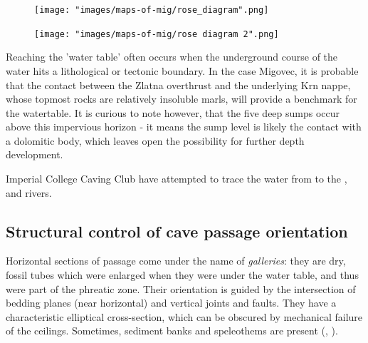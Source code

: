 \begin{pagefigure}
\checkoddpage \ifoddpage \forcerectofloat \else \forceversofloat \fi


\begin{subfigure}{\linewidth}
\centering
 \texttt{[image: "images/maps-of-mig/rose\_diagram".png]}
\caption{}
 \label{fig:rose diagram}
 \end{subfigure}
 \vspace{3mm}
\begin{subfigure}{\linewidth}
\centering
 \texttt{[image: "images/maps-of-mig/rose diagram 2".png]}
 \label{fig:rose diagram 2}
 \caption{}
 \end{subfigure}
 
  \caption{A rose diagram depicting the azimuth ($\phi$) of cave passages. This was extracted from a .3d file produced on Survex, where  $n$ is the number of stations, $\theta$ is the inclination angle and the radial grid is the percentage fraction of passages falling in a specific orientation \emph{(a)} $n=5084$, $\theta <45°$ and \emph{(b)} $n=912$, $\theta \ge 45 \textdegree$. Each sector is 10\textdegree wide. Bin colour shows passage length distribution}
\end{pagefigure}

Reaching the 'water table' often occurs when the underground course of the water hits a lithological or tectonic boundary. In the case Migovec, it is probable that the contact between the Zlatna overthrust and the underlying Krn nappe, whose topmost rocks are relatively insoluble marls, will provide a benchmark for the watertable. It is curious to note however, that the five deep sumps occur above this impervious horizon - it means the sump level is likely the contact with a dolomitic body, which leaves open the possibility for further depth development. 

Imperial College Caving Club have attempted to trace the water from  \citep{hm1} to the ,  and  rivers.
 
 
 \subsection{Structural control of cave passage orientation}
 Horizontal sections of passage come under the name of \emph{galleries}: they are dry, fossil tubes which were enlarged when they were under the water table, and thus were part of the phreatic zone. Their orientation is guided by the intersection of bedding planes (near horizontal) and vertical joints and faults. They have a characteristic elliptical cross-section, which can be obscured by mechanical failure of the ceilings. Sometimes, sediment banks and speleothems are present (, ).

